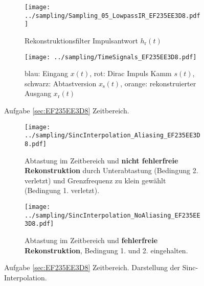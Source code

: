 \begin{figure*}[h!]
\centering
\begin{subfigure}{0.75\textwidth}
\texttt{[image: ../sampling/Sampling\_05\_LowpassIR\_EF235EE3D8.pdf]}
\caption{Rekonstruktionsfilter Impulsantwort $h_\mathrm{r}(t)$}
\label{fig:Sampling_05_LowpassIR_EF235EE3D8}
\end{subfigure}

\begin{subfigure}{0.75\textwidth}
\texttt{[image: ../sampling/TimeSignals\_EF235EE3D8.pdf]}
\caption{blau: Eingang $x(t)$, rot: Dirac Impuls Kamm $s(t)$,
schwarz: Abtastversion $x_\mathrm{s}(t)$, orange: rekonstruierter Ausgang $x_\mathrm{r}(t)$}
\label{fig:TimeSignals_EF235EE3D8}
\end{subfigure}
\caption{Aufgabe \ref{sec:EF235EE3D8} Zeitbereich.}
\label{fig:EF235EE3D8_TimeDomain}
\end{figure*}





\begin{figure*}[h!]
\centering
\begin{subfigure}{0.75\textwidth}
\texttt{[image: ../sampling/SincInterpolation\_Aliasing\_EF235EE3D8.pdf]}
\caption{Abtastung im Zeitbereich und \textbf{nicht fehlerfreie Rekonstruktion}
durch Unterabtastung (Bedingung 2. verletzt) und Grenzfrequenz zu klein gewählt
(Bedingung 1. verletzt).}
\label{fig:SincInterpolation_Aliasing_EF235EE3D8}
\end{subfigure}

\begin{subfigure}{0.75\textwidth}
\texttt{[image: ../sampling/SincInterpolation\_NoAliasing\_EF235EE3D8.pdf]}
\caption{Abtastung im Zeitbereich und \textbf{fehlerfreie Rekonstruktion},
Bedingung 1. und 2. eingehalten.}
\label{fig:SincInterpolation_NoAliasing_EF235EE3D8}
\end{subfigure}
\caption{Aufgabe \ref{sec:EF235EE3D8} Zeitbereich.
Darstellung der Sinc-Interpolation.}
\label{fig:SincInterpolation_EF235EE3D8}
\end{figure*}






\clearpage
